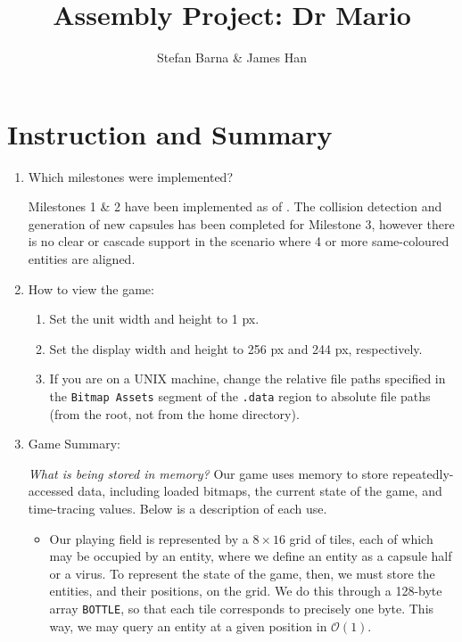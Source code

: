 \documentclass{article}
\title{Assembly Project: Dr Mario}
\author{Stefan Barna \& James Han}
\begin{document}
\maketitle
\section{Instruction and Summary}
\begin{enumerate}
\item Which milestones were implemented?

Milestones 1 \& 2 have been implemented as of \yyyymmdddate{\today}. The collision detection and generation of new capsules has been completed for Milestone 3, however there is no clear or cascade support in the scenario where 4 or more same-coloured entities are aligned.

\item How to view the game:
\begin{enumerate}
\item Set the unit width and height to 1 px.
\item Set the display width and height to 256 px and 244 px, respectively.
\item If you are on a UNIX machine, change the relative file paths specified in the \verb|Bitmap Assets| segment of the \verb|.data| region to absolute file paths (from the root, not from the home directory).
\end{enumerate}

\item Game Summary:

\textit{What is being stored in memory?} Our game uses memory to store repeatedly-accessed data, including loaded bitmaps, the current state of the game, and time-tracing values. Below is a description of each use.

\begin{itemize}
\item Our playing field is represented by a $8\times 16$ grid of tiles, each of which may be occupied by an entity, where we define an entity as a capsule half or a virus. To represent the state of the game, then, we must store the entities, and their positions, on the grid. We do this through a 128-byte array \verb|BOTTLE|, so that each tile corresponds to precisely one byte. This way, we may query an entity at a given position in $\mathcal{O}(1)$.


\end{itemize}
\end{enumerate}
\end{document}

